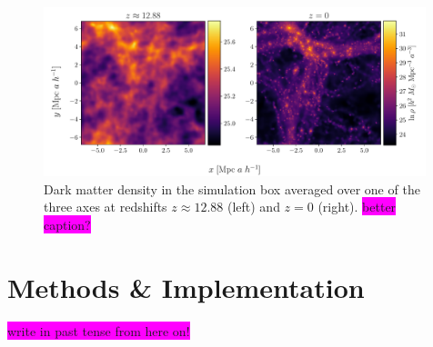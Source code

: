 \documentclass[aps,pra,english,notitlepage,reprint,nofootinbib]{revtex4-1}  %
\begin{document}
\begin{figure}
  \vspace*{-5pt}
  \centering %
  \includegraphics[width=0.99\textwidth]{../figs/density_new_and_old.pdf}
  \caption{Dark matter density in the simulation box averaged over one of the three axes at redshifts $z\approx12.88$ (left) and $z=0$ (right). \colorbox{magenta}{better caption?}}\label{fig:density 2D}
  \vspace*{-5pt}
\end{figure}


\section{Methods \& Implementation}\label{sec:methods}
\colorbox{magenta}{write in past tense from here on!}

\end{document}
